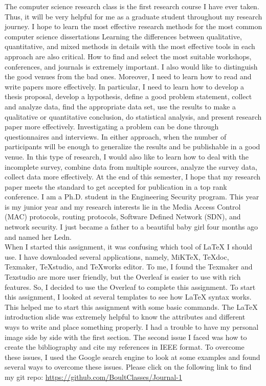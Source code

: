\documentclass{article}
\begin{document}
{\lipsum[0-0]

The computer science research class is the first research course I have ever taken. Thus, it will be very helpful for me as a graduate student throughout my research journey. I hope to learn the most effective research methods for the most common computer science dissertations Learning the differences between qualitative, quantitative, and mixed methods in details with the most effective tools in each approach are also critical. How to find and select the most suitable workshops, conferences, and journals is extremely important. I also would like to distinguish the good venues from the bad ones. Moreover, I need to learn how to read and write papers more effectively. In particular, I need to learn how to develop a thesis proposal, develop a hypothesis, define a good problem statement, collect and analyze data, find the appropriate data set, use the results to make a qualitative or quantitative conclusion, do statistical analysis, and present research paper more effectively. Investigating a problem can be done through questionnaires and interviews. In either approach, when the number of participants will be enough to generalize the results and be publishable in a good venue. In this type of research, I would also like to learn how to deal with the incomplete survey, combine data from multiple sources, analyze the survey data, collect data more effectively. At the end of this semester, I hope that my research paper meets the standard to get accepted for publication in a top rank conference. I am a Ph.D. student in the Engineering Security program. This year is my junior year and my research interests lie in the Media Access Control (MAC) protocols, routing protocols, Software Defined Network (SDN), and network security. I just became a father to a beautiful baby girl four months ago and named her Ledn.\\

When I started this assignment, it was confusing which tool of LaTeX I should use. I have downloaded several applications, namely, MiKTeX, TeXdoc, Texmaker, TeXstudio, and TeXworks editor. To me, I found the Texmaker and Texstudio are more user friendly, but the Overleaf is easier to use with rich features. So, I decided to use the Overleaf to complete this assignment. To start this assignment, I looked at several templates to see how LaTeX syntax works. This helped me to start this assignment with some basic commands. The LaTeX introduction slide was extremely helpful to know the attributes and different ways to write and place something properly. I had a trouble to have my personal image side by side with the first section. The second issue I faced was how to create the bibliography and cite my references in IEEE format. To overcome these issues, I used the Google search engine to look at some examples and found several ways to overcome these issues. Please click on the following link to find my git repo: \url{https://github.com/BoultClasses/Journal-1}\\

}
\end{document}
